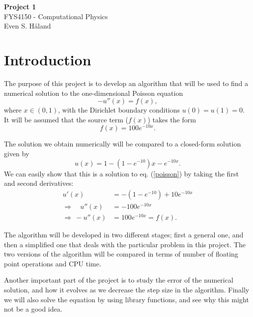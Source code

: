\documentclass[12pt, a4paper]{article}
\begin{document}
\begin{titlepage}
\begin{center}
\vspace*{6cm}
\Huge
\textbf{Project 1} \\
\vspace*{1cm}
\LARGE
FYS4150 - Computational Physics \\ 
\vspace*{10cm}
Even S. Håland 
\end{center}
\end{titlepage}

\section{Introduction}

The purpose of this project is to develop an algorithm that will be used to find a numerical solution 
to the one-dimensional Poisson equation 
\begin{equation}
-u''(x) = f(x), 
\label{poisson}
\end{equation}
where $x\in (0,1)$, with the Dirichlet boundary conditions $u(0)=u(1)=0$. It will be assumed that the 
source term ($f(x)$) takes the form 
\begin{equation}
f(x) = 100e^{-10x}. 
\label{f(x)}
\end{equation}

The solution we obtain numerically will be compared to a closed-form solution given by 
\begin{equation}
u(x) = 1- \left(1-e^{-10}\right)x - e^{-10x}. 
\label{closed-form}
\end{equation}
We can easily show that this is a solution to eq. (\ref{poisson}) by taking the first and second 
derivatives: 
\begin{align*}
    u'(x) & = -\left(1-e^{-10}\right) + 10e^{-10x} \\ 
\Rightarrow \quad  u''(x) & = -100e^{-10x} \\
\Rightarrow \: -u''(x) & = 100e^{-10x} = f(x).  
\end{align*}

The algorithm will be developed in two different stages; first a general one, and then a simplified 
one that deals with the particular problem in this project. The two versions of the algorithm will be 
compared in terms of number of floating point operations and CPU time. 

Another important part of the project is to study the error of the numerical solution, and how it 
evolves as we decrease the step size in the algorithm. Finally we will also solve the equation by using 
library functions, and see why this might not be a good idea. 
\end{document}
